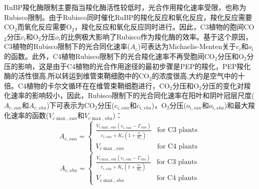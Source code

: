 RuBP羧化酶限制主要指当羧化酶活性较低时，光合作用羧化速率受限，也称为Rubisco限制。由于Rubisco同时催化RuBP的羧化反应和氧化反应，羧化反应需要CO$_2$而氧化反应需要O$_2$，羧化反应和氧化反应同时进行。因此，C3植物的胞间CO$_2$分压$c_i$和O$_2$分压$o_i$的比例极大影响了Rubisco作为羧化酶的效率。基于这个原因，C3植物的Rubisco限制下的光合同化速率($A_c$)可表达为Michaelis-Menten关于$c_i$和$o_i$的函数。此外，C4植物Rubisco限制下的光合羧化速率不再受胞间CO$_2$分压和O$_2$分压的影响，这是由于C4植物的光合作用途径的最初步骤是PEP的羧化，PEP羧化酶的活性很高,所以转运到维管束鞘细胞中的CO$_2$的浓度很高,大约是空气中的十倍。C4植物的卡尔文循环在在维管束鞘细胞进行，CO$_2$分压和O$_2$分压的变化对羧化速率的影响较小，因此，Rubisco限制下的光合同化速率在阳叶和阴叶冠层尺度($A_{c,sun}$和$A_{c,sha}$)下可表示为CO$_2$分压($c_{i,sun}$和$c_{i,sha}$)，O$_2$分压($o_{i,sun}$和$o_{i,sha}$)和最大羧化速率的函数($V_{c \max,sun}$和$V_{c \max,sha}$)：
\begin{equation}\label{A_C1sun}
A_{c,sun}=\begin{cases}
\frac{V_{c \max,sun}\left(c_{i,sun}-\Gamma_{sun}\right)}{c_{i,sun}+K_{c}\left(1+\frac{o_{i}}{K_{o}}\right)}
     & \text{for C3 plants} \\ 
V_{c \max,sun } & \text{for C4 plants}
\end{cases}
\end{equation}
\begin{equation}\label{A_C1sha}
A_{c,sha}=\begin{cases}
\frac{V_{c \max,sha}\left(c_{i,sha}-\Gamma_{sha}\right)}{c_{i,sha}+K_{c}\left(1+\frac{o_{i}}{K_{o}}\right)}
     & \text{for C3 plants} \\ 
V_{c \max,sha } & \text{for C4 plants}
\end{cases}
\end{equation}

